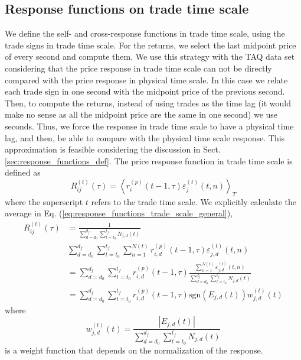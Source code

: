 \subsection{Response functions on trade time scale}
\label{subsec:response_function_trade}

We define the self- and cross-response functions in trade time scale, using the
trade signs in trade time scale. For the returns, we select the last midpoint
price of every second and compute them. We use this strategy with the TAQ data
set considering that the price response in trade time scale can not be directly
compared with the price response in physical time scale. In this case we relate
each trade sign in one second with the midpoint price of the previous second.
Then, to compute the returns, instead of using trades as the time lag (it would
make no sense as all the midpoint price are the same in one second) we use
seconds. Thus, we force the response in trade time scale to have a physical
time lag, and then, be able to compare with the physical time scale response.
This approximation is feasible considering the discussion in Sect.
\ref{sec:response_functions_def}. The price response function in trade time
scale is defined as
\begin{equation}\label{eq:response_functions_trade_scale_general}
    R^{\left(t\right)}_{ij}\left(\tau\right)=\left\langle r^{\left(p\right)}
    _{i}\left(t-1,\tau \right)\varepsilon_{j}^{\left(t\right)}
    \left(t, n\right)\right\rangle _{T}
\end{equation}
where the superscript $t$ refers to the trade time scale. We explicitly
calculate the average in Eq. (\ref{eq:response_functions_trade_scale_general}),
\begin{align}\label{eq:response_trades_explicit}
    R_{ij}^{\left(t\right)}\left(\tau\right)&=\frac{1}{\sum_{d=d_{0}}^{d_{f}}
    \sum_{t=t_{0}}^{t_{f}}N_{j,d} \left(t \right)} \nonumber \\
    &\sum_{d=d_{0}}^{d_{f}}\sum_{t=t_{0}}^{t_{f}}\sum_{n=1}
    ^{N\left(t\right)} r^{\left(p\right)}_{i,d}\left(t-1, \tau\right)
    \varepsilon_{j,d}^{\left(t\right)}\left(t,n\right)\\
    &=\sum_{d=d_{0}}^{d_{f}}\sum_{t=t_{0}}^{t_{f}} r^{\left(p\right)}_{i,d}
    \left(t-1,\tau\right) \frac{\sum_{n=1}^{N\left(t\right)}
    \varepsilon_{j,d}^{\left(t\right)}\left(t,n \right)}
    {\sum_{d=d_{0}}^{d_{f}} \sum_{t=t_{0}}^{t_{f}}N_{j,d}\left(t\right)}
    \nonumber \\
    &=\sum_{d=d_{0}}^{d_{f}}\sum_{t=t_{0}}^{t_{f}}r^{\left(p\right)}_{i,d}
    \left(t-1,\tau\right) \text{sgn}\left(E_{j,d}\left(t\right)\right)
    w_{j,d}^{\left(t\right)}\left(t\right)
\end{align}
where
\begin{equation}\label{eq:trade_weight}
    w_{j,d}^{\left(t\right)}\left(t\right) =
    \frac{\left|E_{j,d}\left(t\right)\right|}{\sum_{d=d_{0}}^{d_{f}}
    \sum_{t=t_{0}}^{t_{f}}N_{j,d} \left(t\right)}
\end{equation}
is a weight function that depends on the normalization of the response.

